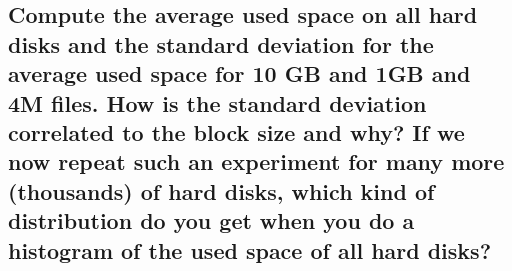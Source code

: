 \documentclass[11pt]{article}
\begin{document}
    \hypertarget{compute-the-average-used-space-on-all-hard-disks-and-the-standard-deviation-for-the-average-used-space-for-10-gb-and-1gb-and-4m-files.-how-is-the-standard-deviation-correlated-to-the-block-size-and-why-if-we-now-repeat-such-an-experiment-for-many-more-thousands-of-hard-disks-which-kind-of-distribution-do-you-get-when-you-do-a-histogram-of-the-used-space-of-all-hard-disks}{%
\subsection{Compute the average used space on all hard disks and
the standard deviation for the average used space for 10 GB and 1GB and
4M files. How is the standard deviation correlated to the block size and
why? If we now repeat such an experiment for many more (thousands) of
hard disks, which kind of distribution do you get when you do a
histogram of the used space of all hard
disks?}\label{compute-the-average-used-space-on-all-hard-disks-and-the-standard-deviation-for-the-average-used-space-for-10-gb-and-1gb-and-4m-files.-how-is-the-standard-deviation-correlated-to-the-block-size-and-why-if-we-now-repeat-such-an-experiment-for-many-more-thousands-of-hard-disks-which-kind-of-distribution-do-you-get-when-you-do-a-histogram-of-the-used-space-of-all-hard-disks}}
\end{document}
